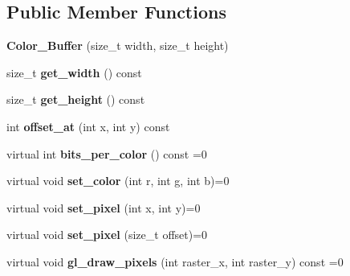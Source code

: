 \subsection*{Public Member Functions}
\begin{DoxyCompactItemize}
\item 
\mbox{\label{classprzurro_1_1_color___buffer_aa98d8c8ce0b45353ef1b089efeb44c35}} 
{\bfseries Color\+\_\+\+Buffer} (size\+\_\+t width, size\+\_\+t height)
\item 
\mbox{\label{classprzurro_1_1_color___buffer_a65822fac1721333004f3deb5d09fe1c5}} 
size\+\_\+t {\bfseries get\+\_\+width} () const
\item 
\mbox{\label{classprzurro_1_1_color___buffer_a56bd8adf7cdd4b445c6870315eef9ee9}} 
size\+\_\+t {\bfseries get\+\_\+height} () const
\item 
\mbox{\label{classprzurro_1_1_color___buffer_a2a9ee35e4a2313a497b6604df00c3691}} 
int {\bfseries offset\+\_\+at} (int x, int y) const
\item 
\mbox{\label{classprzurro_1_1_color___buffer_ac719a4d8ba4a65ab3052312dca3dbd4d}} 
virtual int {\bfseries bits\+\_\+per\+\_\+color} () const =0
\item 
\mbox{\label{classprzurro_1_1_color___buffer_a8654cca64a6c2687d73d1095c31ae6d5}} 
virtual void {\bfseries set\+\_\+color} (int r, int g, int b)=0
\item 
\mbox{\label{classprzurro_1_1_color___buffer_a7bd1987162846de5a3196d999f3f19ad}} 
virtual void {\bfseries set\+\_\+pixel} (int x, int y)=0
\item 
\mbox{\label{classprzurro_1_1_color___buffer_a24f3e1d8c880b79b843a74ab8076f588}} 
virtual void {\bfseries set\+\_\+pixel} (size\+\_\+t offset)=0
\item 
\mbox{\label{classprzurro_1_1_color___buffer_ac9b01556f9914f459068a64d24c33c9b}} 
virtual void {\bfseries gl\+\_\+draw\+\_\+pixels} (int raster\+\_\+x, int raster\+\_\+y) const =0
\end{DoxyCompactItemize}
